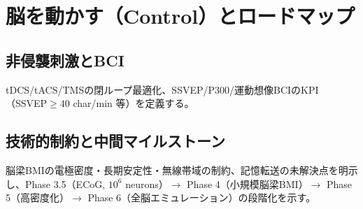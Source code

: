 \chapter{脳を動かす（Control）とロードマップ}
\section{非侵襲刺激とBCI}
tDCS/tACS/TMSの閉ループ最適化、SSVEP/P300/運動想像BCIのKPI（SSVEP\(\geq 40\) char/min 等）を定義する。

\section{技術的制約と中間マイルストーン}
脳梁BMIの電極密度・長期安定性・無線帯域の制約、記憶転送の未解決点を明示し、Phase 3.5（ECoG, \(10^6\) neurons）\(\rightarrow\) Phase 4（小規模脳梁BMI）\(\rightarrow\) Phase 5（高密度化）\(\rightarrow\) Phase 6（全脳エミュレーション）の段階化を示す。



